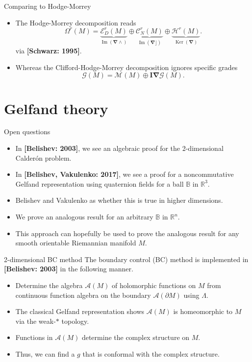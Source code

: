 \documentclass[aspectratio=169]{beamer}
\newcommand\boldgold[1]{\textcolor{csu_gold}{\textbf{#1}}}
\newcommand{\R}{\mathbb{R}}
\newcommand{\algebra}{\mathcal{A}}
\newcommand{\grad}{\boldsymbol{\nabla}}
\newcommand{\G}{\mathcal{G}}
\newcommand{\ball}{\mathbb{B}}
\newcommand{\blade}[1]{\boldsymbol{#1}}
\newcommand{\pseudoscalar}{\blade{I}}
\newcommand{\monogenicfields}[1]{\mathcal{M}^{#1}(M)}
\begin{document}
\begin{frame}{Comparing to Hodge-Morrey}
\vfill
\begin{itemize}
\pause
\item The Hodge-Morrey decomposition reads
\[
\Omega^r(M) = \underbrace{\mathcal{E}_D^r(M)}_{\operatorname{Im}(\grad \wedge)} \oplus \underbrace{\mathcal{C}_N^r(M)}_{\operatorname{Im}(\grad \rfloor)} \oplus \underbrace{\mathcal{H}^r(M)}_{\operatorname{Ker}(\grad)}.
\]
via \boldgold{[Schwarz: 1995]}.
\pause 
\item Whereas the Clifford-Hodge-Morrey decomposition ignores specific grades
\[
\G(M) = \monogenicfields{} \oplus \pseudoscalar \grad \G(M).
\]
\end{itemize}
\vfill
\end{frame}

\section{Gelfand theory}

\begin{frame}{Open questions}
\vfill
\begin{itemize}
\pause
    \item In \boldgold{[Belishev: 2003]}, we see an algebraic proof for the 2-dimensional Calder\'on problem.
\pause
    \item In \boldgold{[Belishev, Vakulenko: 2017]}, we see a proof for a noncommutative Gelfand representation using quaternion fields for a ball $\ball$ in $\R^3$. 
\pause
    \item Belishev and Vakulenko as whether this is true in higher dimensions.
\pause
    \item We prove an analogous result for an arbitrary $\ball$ in $\R^n$.
\pause
    \item This approach can hopefully be used to prove the analogous result for any smooth orientable Riemannian manifold $M$.
\end{itemize}
\vfill
\end{frame}

\begin{frame}{2-dimensional BC method}
\vfill
The boundary control (BC) method is implemented in \boldgold{[Belishev: 2003]} in the following manner.
\begin{itemize}
    \pause
    \item Determine the algebra $\algebra{}(M)$ of holomorphic functions on $M$ from continuous function algebra on the boundary $\algebra{}(\partial M)$ using $\Lambda$.
    \pause
    \item The classical Gelfand representation shows $\algebra{}(M)$ is homeomorphic to $M$ via the weak-$\ast$ topology.
    \pause
    \item Functions in $\algebra{}(M)$ determine the complex structure on $M$.
    \pause
    \item Thus, we can find a $g$ that is conformal with the complex structure.
\end{itemize}
\vfill
\end{frame}
\end{document}
